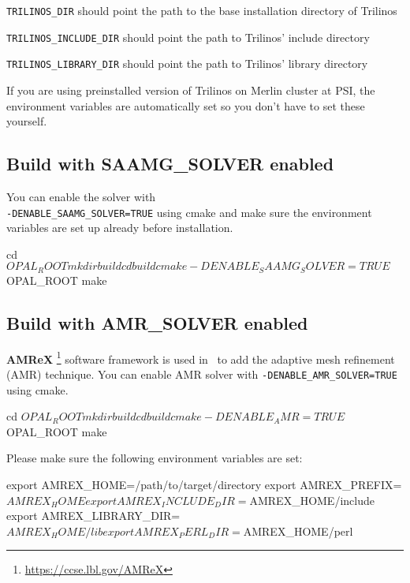 \texttt{TRILINOS\_DIR} should point the path to the base installation directory of Trilinos

\texttt{TRILINOS\_INCLUDE\_DIR} should point the path to Trilinos' include directory

\texttt{TRILINOS\_LIBRARY\_DIR} should point the path to Trilinos' library directory

If you are using preinstalled version of Trilinos on Merlin cluster at PSI, the environment variables
are automatically set so you don't have to set these yourself.

\begin{footnotesize}
\end{footnotesize}

\subsection{Build \opal with SAAMG\_SOLVER enabled}
You can enable the solver with\\ \texttt{-DENABLE\_SAAMG\_SOLVER=TRUE} using cmake
and make sure the environment variables 
are set up already before {\opal} installation.

\begin{footnotesize}
\begin{example}
cd $OPAL_ROOT
mkdir build
cd build
cmake -DENABLE_SAAMG_SOLVER=TRUE $OPAL_ROOT
make
\end{example}
\end{footnotesize}

\subsection{Build \opal with AMR\_SOLVER enabled}
{\bf AMReX} \footnote{\url{https://ccse.lbl.gov/AMReX}} software framework is used in \opal\  to add the adaptive mesh
refinement (AMR) technique. You can enable AMR solver with {\tt -DENABLE\_AMR\_SOLVER=TRUE} using cmake.

\begin{footnotesize}
\begin{example}
cd $OPAL_ROOT
mkdir build
cd build
cmake -DENABLE_AMR=TRUE $OPAL_ROOT
make
\end{example}
\end{footnotesize}
Please make sure the following environment variables are set:
\begin{footnotesize}
\begin{example}
export AMREX_HOME=/path/to/target/directory
export AMREX_PREFIX=$AMREX_HOME
export AMREX_INCLUDE_DIR=$AMREX_HOME/include
export AMREX_LIBRARY_DIR=$AMREX_HOME/lib
export AMREX_PERL_DIR=$AMREX_HOME/perl
\end{example}
 \label{subsec:envvar_AMR}
\end{footnotesize}

